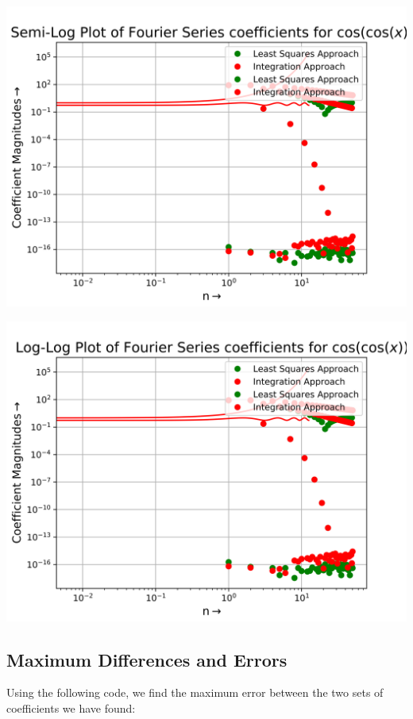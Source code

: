 \documentclass[12pt]{article}
\begin{document}
\begin{center}
    \includegraphics[scale=0.8]{images/Figure13.png}
\end{center}
\begin{center}
    \includegraphics[scale=0.8]{images/Figure14.png}
\end{center}
\pagebreak

\subsection{Maximum Differences and Errors}

Using the following code, we find the maximum error between the two sets of coefficients we have found:
\end{document}
